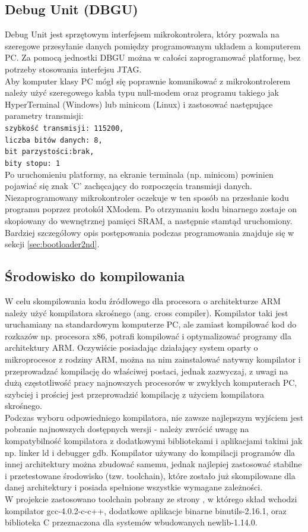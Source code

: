 \documentclass[a4paper,12pt]{book}
\begin{document}
			\subsection{Debug Unit (DBGU)}
				Debug Unit jest sprzętowym interfejsem mikrokontrolera, który pozwala na szeregowe przesyłanie danych pomiędzy programowanym układem a komputerem PC. Za pomocą jednostki DBGU można w całości zaprogramować platformę, bez potrzeby stosowania interfejsu JTAG.\\
				Aby komputer klasy PC mógł się poprawnie komunikować z mikrokontrolerem należy użyć szeregowego kabla typu null-modem oraz programu takiego jak HyperTerminal (Windows) lub minicom (Linux) i zastosować następujące parametry transmisji:\\
				\texttt{szybkość transmisji: 115200,\\liczba bitów danych: 8,\\bit parzystości:brak,\\bity stopu: 1}\\
				Po uruchomieniu platformy, na ekranie terminala (np. minicom) powinien pojawiać się znak 'C' zachęcający do rozpoczęcia transmisji danych. Niezaprogramowany mikrokontroler oczekuje w ten sposób na przesłanie kodu programu poprzez protokół XModem. Po otrzymaniu kodu binarnego zostaje on skopiowany do wewnętrznej pamięci SRAM, a następnie stamtąd uruchomiony.\\
				Bardziej szczegółowy opis postępowania podczas programowania znajduje się w sekcji \ref{sec:bootloader2nd}.
			\subsection{Środowisko do kompilowania}
				W celu skompilowania kodu źródłowego dla procesora o architekturze ARM należy użyć kompilatora skrośnego (ang. cross compiler). Kompilator taki jest uruchamiany na standardowym komputerze PC, ale zamiast kompilować kod do rozkazów np. procesora x86, potrafi kompilować i optymalizować programy dla architektury ARM. Oczywiście posiadając działający system oparty o mikroprocesor z rodziny ARM, można na nim zainstalować natywny kompilator i przeprowadzać kompilację do właściwej postaci, jednak zazwyczaj, z uwagi na dużą częstotliwość pracy najnowszych procesorów w zwykłych komputerach PC, szybciej i prościej jest przeprowadzić kompilację z użyciem kompilatora skrośnego.\\
				Podczas wyboru odpowiedniego kompilatora, nie zawsze najlepszym wyjściem jest pobranie najnowszych dostępnych wersji - należy zwrócić uwagę na kompatybilność kompilatora z dodatkowymi bibliotekami i aplikacjami takimi jak np. linker ld i debugger gdb. Kompilator używany do kompilacji programów dla innej architektury można zbudować samemu, jednak najlepiej zastosować stabilne i przetestowane środowisko (tzw. toolchain), które zostało już skompilowane dla danej architektury i posiada spełnione wszystkie wymagane zależności.\\
				W projekcie zastosowano toolchain pobrany ze strony \cite{website:gnuarm}, w którego skład wchodzi kompilator gcc-4.0.2-c-c++, dodatkowe aplikacje binarne binutils-2.16.1, oraz biblioteka C przeznaczona dla systemów wbudowanych newlib-1.14.0.
\end{document}
